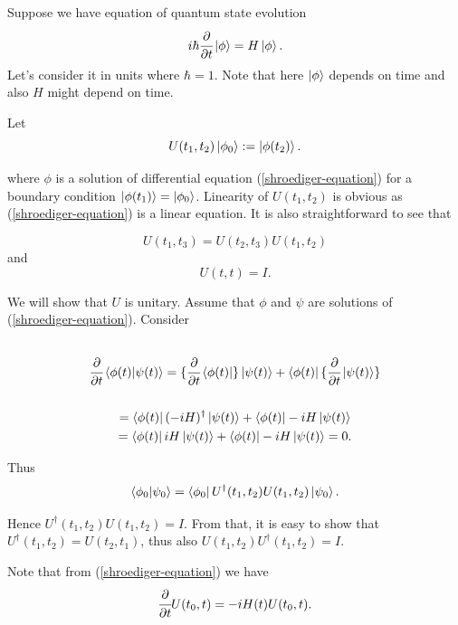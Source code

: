 \documentclass[main.tex]{subfiles}
\begin{document}
Suppose we have equation of quantum state evolution
\begin{equation}
\label{shroediger-equation}
i\hbar\cfrac{\partial}{\partial t} \ket{\phi} = H\ket{\phi}.
\end{equation}
Let's consider it in units where $\hbar = 1$. Note that here $\ket{\phi}$ depends on time and also $H$ might depend on time.

Let 
\begin{equation}
U(t_1, t_2)\ket{\phi_0} := \ket{\phi(t_2)}.
\end{equation}

where $\phi$ is a solution of differential equation (\ref{shroediger-equation}) for a boundary condition $\ket{\phi(t_1)} = \ket{\phi_0}$. Linearity of $U(t_1, t_2)$ is obvious as (\ref{shroediger-equation}) is a linear equation. It is also straightforward to see that 

\begin{equation}
U(t_1,t_3) = U(t_2, t_3)U(t_1, t_2)
\end{equation}
and
\begin{equation}
U(t, t) = I.
\end{equation}

We will show that $U$ is unitary.
Assume that $\phi$ and $\psi$ are solutions of (\ref{shroediger-equation}). Consider
\begin{multline*}
\\
\cfrac{\partial}{\partial t} \bra{\phi(t)}\ket{\psi(t)} = \{\cfrac{\partial}{\partial t} \bra{\phi(t)}\}\ket{\psi(t)} + \bra{\phi(t)}\{\cfrac{\partial}{\partial t} \ket{\psi(t)}\}\\
\\ = \bra{\phi(t)} (-iH)^\dag \ket{\psi(t)} + \bra{\phi(t)} -iH \ket{\psi(t)}
\\ = \bra{\phi(t)} iH \ket{\psi(t)} +  \bra{\phi(t)} -iH \ket{\psi(t)} = 0.
\\
\end{multline*}

Thus
\begin{equation}
\bra{\phi_0}\ket{\psi_0} = \bra{\phi_0}U^\dag(t_1, t_2) U(t_1, t_2) \ket{\psi_0}.
\end{equation} 

Hence $U^\dag(t_1, t_2) U(t_1, t_2) = I$. From that, it is easy to show that $U^\dag(t_1, t_2) = U(t_2, t_1)$, thus also $U(t_1, t_2) U^\dag(t_1, t_2) = I$.

Note that from (\ref{shroediger-equation}) we have
\begin{equation}
\cfrac{\partial}{\partial t} U(t_0, t) = -i H(t) U(t_0, t).
\end{equation}
\end{document}
